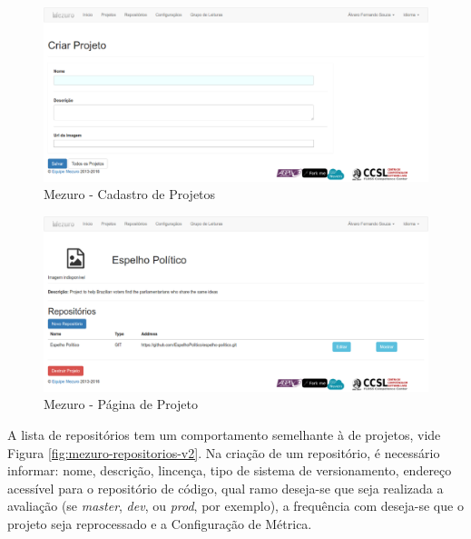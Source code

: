 \begin{figure}[!htb]
	\centering
    \includegraphics[keepaspectratio=true,scale=0.3]
    {figuras/mezuro-projeto-cadastro.eps}
  \caption{Mezuro - Cadastro de Projetos}
	\label{fig:mezuro-projeto-cadastro}
\end{figure}

\newpage

\begin{figure}[!htb]
	\centering
    \includegraphics[keepaspectratio=true,scale=0.3]
    {figuras/mezuro-projeto-view.eps}
  \caption{Mezuro - Página de Projeto}
	\label{fig:mezuro-projeto-view}
\end{figure}

\newpage

A lista de repositórios tem um comportamento semelhante à de projetos, vide
Figura \ref{fig:mezuro-repositorios-v2}. Na criação de um repositório, é
necessário informar: nome, descrição, lincença, tipo de sistema de
versionamento, endereço acessível para o repositório de código, qual ramo
deseja-se que seja realizada a avaliação (se \textit{master},
\textit{dev}, ou \textit{prod}, por exemplo), a frequência com deseja-se que o
projeto seja reprocessado e a Configuração de Métrica.

